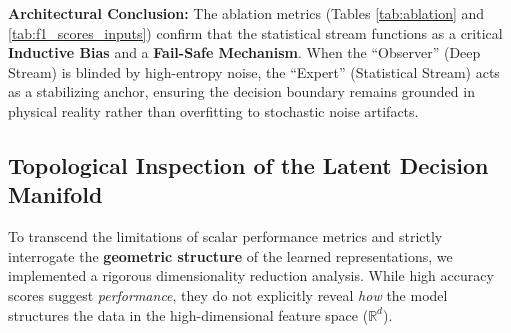 \documentclass[5p,times,twocolumn]{elsarticle}
\begin{document}
\textbf{Architectural Conclusion:}
The ablation metrics (Tables \ref{tab:ablation} and \ref{tab:f1_scores_inputs}) confirm that the statistical stream functions as a critical \textbf{Inductive Bias} and a \textbf{Fail-Safe Mechanism}. When the ``Observer'' (Deep Stream) is blinded by high-entropy noise, the ``Expert'' (Statistical Stream) acts as a stabilizing anchor, ensuring the decision boundary remains grounded in physical reality rather than overfitting to stochastic noise artifacts.

\begin{table}[htbp]
\centering
\caption{\textbf{Macro-F1 Score Sensitivity Analysis.} Comparison of class-wise balanced performance across model variants. The catastrophic drop in the ``w/o Statistical Features'' variant (to 65.02\%) at -10 dB highlights that pure deep learning models lose the ability to recall minority fault classes under extreme noise.}
\label{tab:f1_scores_inputs}
\renewcommand{\arraystretch}{1.2}
\setlength{\tabcolsep}{12pt}
\end{table}

\subsection{Topological Inspection of the Latent Decision Manifold}
To transcend the limitations of scalar performance metrics and strictly interrogate the \textbf{geometric structure} of the learned representations, we implemented a rigorous dimensionality reduction analysis.
While high accuracy scores suggest \textit{performance}, they do not explicitly reveal \textit{how} the model structures the data in the high-dimensional feature space ($\mathbb{R}^{d}$).
\end{document}
